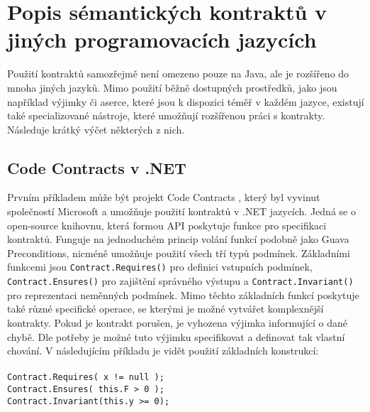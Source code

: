 	\section{Popis sémantických kontraktů v jiných programovacích jazycích}
		Použití kontraktů samozřejmě není omezeno pouze na Java, ale je rozšířeno do mnoha jiných jazyků. Mimo použití běžně dostupných prostředků, jako jsou například výjimky či aserce, které jsou k dispozici téměř v každém jazyce, existují také specializované nástroje, které umožňují rozšířenou práci s kontrakty. Následuje krátký výčet některých z nich.
		
		\subsection{Code Contracts v .NET}
			Prvním příkladem může být projekt Code Contracts \cite{codeContracts}\cite{codeContracts2}, který byl vyvinut společností Microsoft a umožňuje použití kontraktů v .NET jazycích. Jedná se o open-source knihovnu, která formou API poskytuje funkce pro specifikaci kontraktů. Funguje na jednoduchém princip volání funkcí podobně jako Guava Preconditions, nicméně umožňuje použití všech tří typů podmínek. Základními funkcemi jsou \texttt{Contract.Requires()} pro definici vstupních podmínek, \texttt{Contract.Ensures()} pro zajištění správného výstupu a \texttt{Contract.Invariant()} pro reprezentaci neměnných podmínek. Mimo těchto základních funkcí poskytuje také různé specifické operace, se kterými je možné vytvářet komplexnější kontrakty. Pokud je kontrakt porušen, je vyhozena výjimka informující o dané chybě. Dle potřeby je možné tuto výjimku specifikovat a definovat tak vlastní chování. V následujícím příkladu je vidět použití základních konstrukcí:\\\\
			\- \- \- \- \- \texttt{Contract.Requires( x != null );}\\
			\- \- \- \- \- \texttt{Contract.Ensures( this.F > 0 );}\\
			\- \- \- \- \- \texttt{Contract.Invariant(this.y >= 0);}

			
